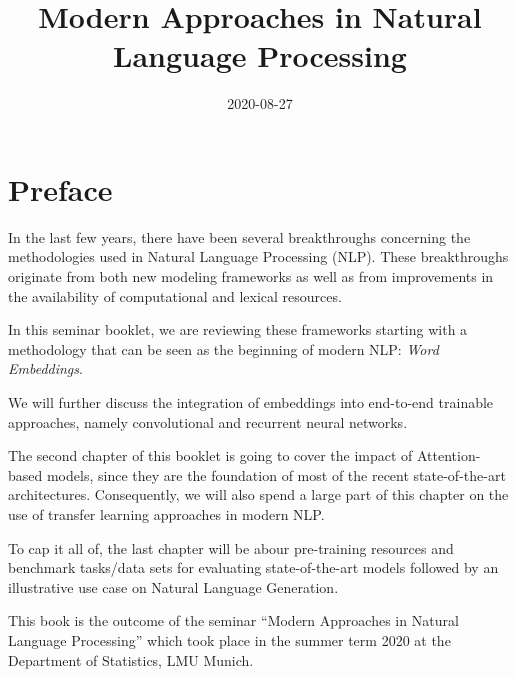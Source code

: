 \documentclass[]{krantz}
\title{Modern Approaches in Natural Language Processing}
\author{}
\date{\vspace{-2.5em}2020-08-27}
\begin{document}
\maketitle


\thispagestyle{empty}

\begin{center}
\end{center}

\setlength{\abovedisplayskip}{-5pt}
\setlength{\abovedisplayshortskip}{-5pt}

{
\hypersetup{linkcolor=}
\setcounter{tocdepth}{0}
\tableofcontents
}
\hypertarget{preface}{%
\chapter*{Preface}\label{preface}}


In the last few years, there have been several breakthroughs concerning the methodologies used in Natural Language Processing (NLP). These breakthroughs originate from both new modeling frameworks as well as from improvements in the availability of computational and lexical resources.

In this seminar booklet, we are reviewing these frameworks starting with a methodology that can be seen as the beginning of modern NLP: \emph{Word Embeddings}.

We will further discuss the integration of embeddings into end-to-end trainable approaches, namely convolutional and recurrent neural networks.

The second chapter of this booklet is going to cover the impact of Attention-based models, since they are the foundation of most of the recent state-of-the-art architectures. Consequently, we will also spend a large part of this chapter on the use of transfer learning approaches in modern NLP.

To cap it all of, the last chapter will be abour pre-training resources and benchmark tasks/data sets for evaluating state-of-the-art models followed by an illustrative use case on Natural Language Generation.

This book is the outcome of the seminar ``Modern Approaches in Natural Language Processing'' which took place in the summer term 2020 at the Department of Statistics, LMU Munich.
\end{document}
